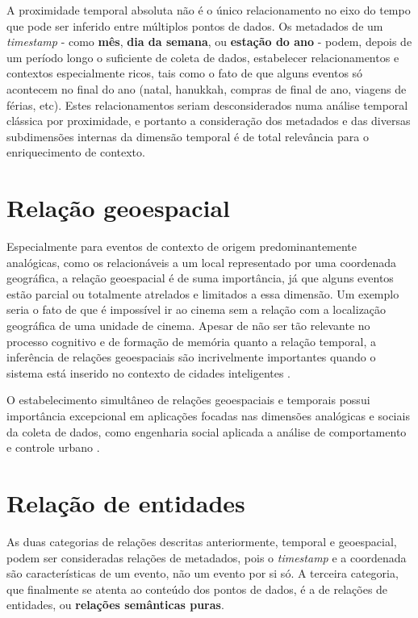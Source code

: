 A proximidade temporal absoluta não é o único relacionamento no eixo do tempo que pode ser inferido entre múltiplos pontos de dados. Os metadados de um \textit{timestamp} - como \textbf{mês}, \textbf{dia da semana}, ou \textbf{estação do ano} - podem, depois de um período longo o suficiente de coleta de dados, estabelecer relacionamentos e contextos especialmente ricos, tais como o fato de que alguns eventos só acontecem no final do ano (natal, hanukkah, compras de final de ano, viagens de férias, etc). Estes relacionamentos seriam desconsiderados numa análise temporal clássica por proximidade, e portanto a consideração dos metadados e das diversas subdimensões internas da dimensão temporal é de total relevância para o enriquecimento de contexto.

\section{Relação geoespacial}

Especialmente para eventos de contexto de origem predominantemente analógicas, como os relacionáveis a um local representado por uma coordenada geográfica, a relação geoespacial é de suma importância, já que alguns eventos estão parcial ou totalmente atrelados e limitados a essa dimensão. Um exemplo seria o fato de que é impossível ir ao cinema sem a relação com a localização geográfica de uma unidade de cinema. Apesar de não ser tão relevante no processo cognitivo e de formação de memória quanto a relação temporal, a inferência de relações geoespaciais são incrivelmente importantes quando o sistema está inserido no contexto de cidades inteligentes \cite{doi:10.1080/10095020.2013.772802}.

O estabelecimento simultâneo de relações geoespaciais e temporais possui importância excepcional em aplicações focadas nas dimensões analógicas e sociais da coleta de dados, como engenharia social aplicada a análise de comportamento e controle urbano \cite{Psyllidis2017APF}.

\section{Relação de entidades}

As duas categorias de relações descritas anteriormente, temporal e geoespacial, podem ser consideradas relações de metadados, pois o \textit{timestamp} e a coordenada são características de um evento, não um evento por si só. A terceira categoria, que finalmente se atenta ao conteúdo dos pontos de dados, é a de relações de entidades, ou \textbf{relações semânticas puras}.

